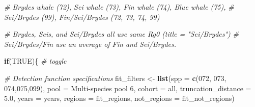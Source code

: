 \documentclass[
]{book}
\newenvironment{Shaded}{\begin{snugshade}}{\end{snugshade}}
\newcommand{\AttributeTok}[1]{\textcolor[rgb]{0.13,0.29,0.53}{#1}}
\newcommand{\CommentTok}[1]{\textcolor[rgb]{0.56,0.35,0.01}{\textit{#1}}}
\newcommand{\ConstantTok}[1]{\textcolor[rgb]{0.56,0.35,0.01}{#1}}
\newcommand{\ControlFlowTok}[1]{\textcolor[rgb]{0.13,0.29,0.53}{\textbf{#1}}}
\newcommand{\FloatTok}[1]{\textcolor[rgb]{0.00,0.00,0.81}{#1}}
\newcommand{\FunctionTok}[1]{\textcolor[rgb]{0.13,0.29,0.53}{\textbf{#1}}}
\newcommand{\NormalTok}[1]{#1}
\newcommand{\OtherTok}[1]{\textcolor[rgb]{0.56,0.35,0.01}{#1}}
\newcommand{\StringTok}[1]{\textcolor[rgb]{0.31,0.60,0.02}{#1}}
\begin{document}
\begin{Shaded}
\begin{Highlighting}[]
\CommentTok{\# Bryde\textquotesingle{}s whale (72), Sei whale (73), Fin whale (74), Blue whale (75),}
\CommentTok{\# Sei/Bryde\textquotesingle{}s (99), Fin/Sei/Bryde\textquotesingle{}s (72, 73, 74, 99)}

\CommentTok{\# Bryde\textquotesingle{}s, Sei\textquotesingle{}s, and Sei/Bryde\textquotesingle{}s all use same Rg0 (title = "Sei/Bryde\textquotesingle{}s")}
\CommentTok{\# Sei/Bryde\textquotesingle{}s/Fin use an average of Fin and Sei/Bryde\textquotesingle{}s.}

\ControlFlowTok{if}\NormalTok{(}\ConstantTok{TRUE}\NormalTok{)\{ }\CommentTok{\# toggle}

  \CommentTok{\# Detection function specifications}
\NormalTok{  fit\_filters }\OtherTok{\textless{}{-}}
    \FunctionTok{list}\NormalTok{(}\AttributeTok{spp =} \FunctionTok{c}\NormalTok{(}\StringTok{\textquotesingle{}072\textquotesingle{}}\NormalTok{, }\StringTok{\textquotesingle{}073\textquotesingle{}}\NormalTok{, }\StringTok{\textquotesingle{}074\textquotesingle{}}\NormalTok{,}\StringTok{\textquotesingle{}075\textquotesingle{}}\NormalTok{,}\StringTok{\textquotesingle{}099\textquotesingle{}}\NormalTok{),}
         \AttributeTok{pool =} \StringTok{\textquotesingle{}Multi{-}species pool 6\textquotesingle{}}\NormalTok{,}
         \AttributeTok{cohort =} \StringTok{\textquotesingle{}all\textquotesingle{}}\NormalTok{,}
         \AttributeTok{truncation\_distance =} \FloatTok{5.0}\NormalTok{,}
         \AttributeTok{years =}\NormalTok{ years,}
         \AttributeTok{regions =}\NormalTok{ fit\_regions,}
         \AttributeTok{not\_regions =}\NormalTok{ fit\_not\_regions)}


\end{Highlighting}
\end{Shaded}
\end{document}
